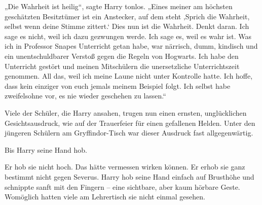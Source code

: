 „Die Wahrheit ist heilig“, sagte Harry tonlos. „Eines meiner am höchsten geschätzten Besitztümer ist ein Anstecker, auf dem steht ‚Sprich die Wahrheit, selbst wenn deine Stimme zittert.‘ Dies nun ist die Wahrheit. Denkt daran. Ich sage es nicht, weil ich dazu gezwungen werde. Ich sage es, weil es wahr ist. Was ich in Professor Snapes Unterricht getan habe, war närrisch, dumm, kindisch und ein unentschuldbarer Verstoß gegen die Regeln von Hogwarts. Ich habe den Unterricht gestört und meinen Mitschülern die unersetzliche Unterrichtszeit genommen. All das, weil ich meine Laune nicht unter Kontrolle hatte. Ich hoffe, dass kein einziger von euch jemals meinem Beispiel folgt. Ich selbst habe zweifelsohne vor, es nie wieder geschehen zu lassen.“

Viele der Schüler, die Harry ansahen, trugen nun einen ernsten, unglücklichen Gesichtsausdruck, wie auf der Trauerfeier für einen gefallenen Helden. Unter den jüngeren Schülern am Gryffindor-Tisch war dieser Ausdruck fast allgegenwärtig.

Bis Harry seine Hand hob.

Er hob sie nicht hoch. Das hätte vermessen wirken können. Er erhob sie ganz bestimmt nicht gegen Severus. Harry hob seine Hand einfach auf Brusthöhe und schnippte sanft mit den Fingern – eine sichtbare, aber kaum hörbare Geste. Womöglich hatten viele am Lehrertisch sie nicht einmal gesehen.

